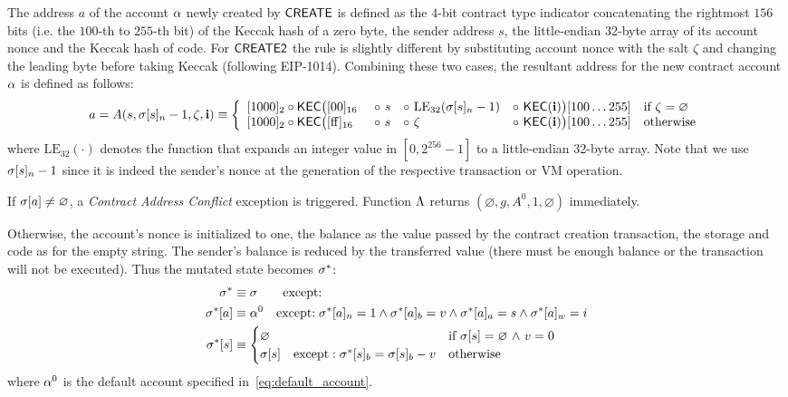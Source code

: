 The address $a$ of the account $\mathbf{\alpha}$ newly created by {\hyperlink{create}{$\mathsf{CREATE}$}} is defined as the $4$-bit contract type indicator concatenating the rightmost $156$ bits (i.e. the $100$-th to $255$-th bit) of the Keccak hash of a zero byte, the sender address $s$, the little-endian 32-byte array of its account nonce and the Keccak hash of \cvm code. 
% 
For {\hyperlink{create2}{$\mathsf{CREATE2}$}} the rule is slightly different by substituting account nonce with the salt $\zeta$ and changing the leading byte before taking Keccak (following EIP-1014).
Combining these two cases, 
the resultant address for the new contract account $\mathbf{\alpha}$ is defined as follows:
\begin{align}\label{eq:new-address}
	a= A(s, \st[s]_{n} - 1, \zeta, \vec{i}) \eqdef 
	\left\{\begin{array}{l l l l l}
	 	\typecontract \circ \kec\big([\mathrm{00}]_{16} &~\circ~ s &\circ~ \mathrm{LE}_{32}(\st[s]_n-1) &\circ~ \kec(\vec{i}) \big)[100 \dots 255]
	 	& \text{if}\ \zeta = \varnothing \\
	 	\typecontract \circ \kec\big([\mathrm{ff}]_{16} &~\circ~ s &\circ~  \zeta   &\circ~ \kec(\vec{i}) \big)[100 \dots 255] 
		& \text{otherwise}
	\end{array} \right.
\end{align}
where $\mathrm{LE}_{32}(\cdot)$ denotes the function that expands an integer value in $[0,2^{256}-1]$ to a little-endian 32-byte array. 
%
Note that we use $\mathbf{\sigma}[s]_n-1$ since it is indeed the sender's nonce at the generation of the respective transaction or VM operation. 

If $\mathbf{\sigma}[a]\neq \varnothing$, a \emph{Contract Address Conflict} exception is triggered. Function $\mathrm{\Lambda}$ returns $(\varnothing,g,A^0,1,\varnothing)$ immediately. 

Otherwise, the account's nonce is initialized to one, the balance as the value passed by the contract creation transaction,
the storage and code as for the empty string.
The sender's balance is reduced by the transferred value (there must be enough balance or the transaction will not be executed).
Thus the mutated state becomes $\mathbf{\sigma}^*$:
\begin{align}
	\mathbf{\sigma}^* & \equiv \mathbf{\sigma} \qquad{ \text{except:}}\\
	\mathbf{\sigma}^*[a] &\equiv \mathbf{\alpha}^0 \quad\text{except:}\; \mathbf{\sigma}^*[a]_n=1 \wedge \mathbf{\sigma}^*[a]_b=v \wedge \mathbf{\sigma}^*[a]_a=s \wedge \mathbf{\sigma}^*[a]_w=i\\
	\mathbf{\sigma}^*[s] &\equiv \begin{cases}
		\varnothing & \mbox{if $\mathbf{\sigma}[s]=\varnothing$ $\land$ $v=0$}\\
		\mathbf{\sigma}[s]\quad\mbox{except}:	\mathbf{\sigma}^*[s]_b=\mathbf{\sigma}[s]_b-v	& \mbox{otherwise}
	\end{cases}
\end{align}
where $\mathbf{\alpha}^0$ is the default account specified in~\cref{eq:default_account}. 

